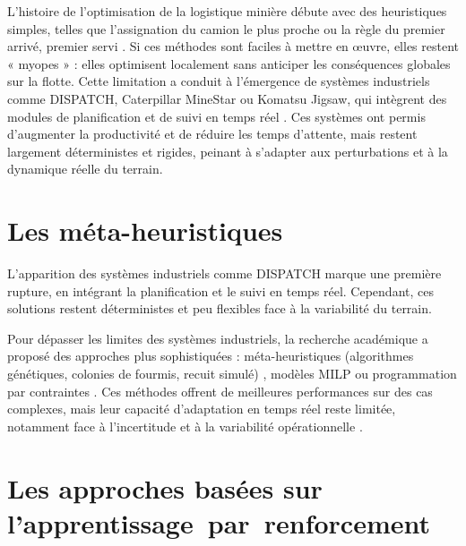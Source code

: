 \documentclass[11pt,a4paper]{report}
\begin{document}
L’histoire de l’optimisation de la logistique minière débute avec des heuristiques simples, telles que l’assignation du camion le plus proche ou la règle du premier arrivé, premier servi \cite{MohanMunirathinam1994, Alarie2002}. Si ces méthodes sont faciles à mettre en œuvre, elles restent « myopes » : elles optimisent localement sans anticiper les conséquences globales sur la flotte. Cette limitation a conduit à l’émergence de systèmes industriels comme DISPATCH, Caterpillar MineStar ou Komatsu Jigsaw, qui intègrent des modules de planification et de suivi en temps réel \cite{Afrapoli2017, MehrnazMohtasham2023}. Ces systèmes ont permis d’augmenter la productivité et de réduire les temps d’attente, mais restent largement déterministes et rigides, peinant à s’adapter aux perturbations et à la dynamique réelle du terrain.

\section{Les méta-heuristiques}
\label{sec:metaheuristiques}


L’apparition des systèmes industriels comme DISPATCH marque une première rupture, en intégrant la planification et le suivi en temps réel. Cependant, ces solutions restent déterministes et peu flexibles face à la variabilité du terrain.


Pour dépasser les limites des systèmes industriels, la recherche académique a proposé des approches plus sophistiquées : méta-heuristiques (algorithmes génétiques, colonies de fourmis, recuit simulé) \cite{MJFSouza2010, Subtil2011}, modèles MILP ou programmation par contraintes \cite{Ahangaran2012, AmandaSmith2020, ChungHTa2013, ZhongxinWang2022}. Ces méthodes offrent de meilleures performances sur des cas complexes, mais leur capacité d’adaptation en temps réel reste limitée, notamment face à l’incertitude et à la variabilité opérationnelle \cite{BurakOzdemir2019, ShivPrakashUpadhyay2017, MarceloMorettiFioroni2008}.

\section{Les approches basées sur l'\mbox{apprentissage par renforcement}}
\label{sec:paradigme-rl}
\end{document}
